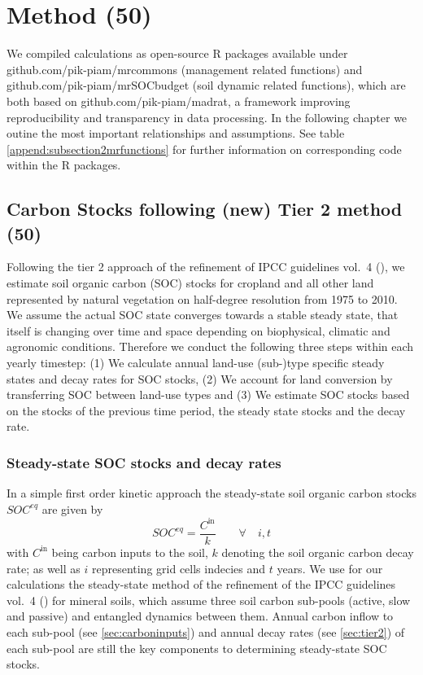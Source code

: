 \documentclass[gc, manuscript]{copernicus}
\begin{document}
\newpage

\hypertarget{method-50}{%
\section{Method (50)}\label{method-50}}

We compiled calculations as open-source R packages available under github.com/pik-piam/mrcommons (management related functions) and github.com/pik-piam/mrSOCbudget (soil dynamic related functions), which are both based on github.com/pik-piam/madrat, a framework improving reproducibility and transparency in data processing.
In the following chapter we outine the most important relationships and assumptions. See table \ref{append:subsection2mrfunctions} for further information on corresponding code within the R packages.

\hypertarget{sec:carbonbudget}{%
\subsection{Carbon Stocks following (new) Tier 2 method (50)}\label{sec:carbonbudget}}

Following the tier 2 approach of the refinement of IPCC guidelines vol.~4 (\citet{ipcc_2019_2019}), we estimate soil organic carbon (SOC) stocks for cropland and all other land represented by natural vegetation on half-degree resolution from 1975 to 2010. We assume the actual SOC state converges towards a stable steady state, that itself is changing over time and space depending on biophysical, climatic and agronomic conditions. Therefore we conduct the following three steps within each yearly timestep:
(1) We calculate annual land-use (sub-)type specific steady states and decay rates for SOC stocks,
(2) We account for land conversion by transferring SOC between land-use types and
(3) We estimate SOC stocks based on the stocks of the previous time period, the steady state stocks and the decay rate.

\hypertarget{steady-state-soc-stocks-and-decay-rates}{%
\subsubsection{Steady-state SOC stocks and decay rates}\label{steady-state-soc-stocks-and-decay-rates}}

In a simple first order kinetic approach the steady-state soil organic carbon stocks \(SOC^{eq}\) are given by
\begin{equation}
SOC^{eq} =\frac{C^{\textrm{in}}}{k} \qquad\forall\quad i,t
\label{eq:inoutflow}
\end{equation}
with \(C^{\textrm{in}}\) being carbon inputs to the soil, \(k\) denoting the soil organic carbon decay rate; as well as \(i\) representing grid cells indecies and \(t\) years. We use for our calculations the steady-state method of the refinement of the IPCC guidelines vol.~4 (\citet{ipcc_2019_2019}) for mineral soils, which assume three soil carbon sub-pools (active, slow and passive) and entangled dynamics between them. Annual carbon inflow to each sub-pool (see \ref{sec:carboninputs}) and annual decay rates (see \ref{sec:tier2}) of each sub-pool are still the key components to determining steady-state SOC stocks.
\end{document}
